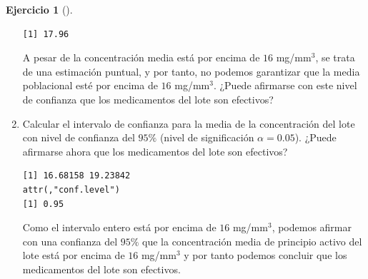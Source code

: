 \documentclass[
  a4paper,
]{scrreport}
\newenvironment{Shaded}{\begin{snugshade}}{\end{snugshade}}
\newcommand{\FunctionTok}[1]{\textcolor[rgb]{0.28,0.35,0.67}{#1}}
\newcommand{\NormalTok}[1]{\textcolor[rgb]{0.00,0.23,0.31}{#1}}
\newcommand{\OtherTok}[1]{\textcolor[rgb]{0.00,0.23,0.31}{#1}}
\newcommand{\SpecialCharTok}[1]{\textcolor[rgb]{0.37,0.37,0.37}{#1}}
\theoremstyle{definition}
\newtheorem{exercise}{Ejercicio}[chapter]
\theoremstyle{remark}
\begin{document}
\begin{exercise}[]
\begin{enumerate}
\begin{tcolorbox}
\begin{Shaded}
\end{Shaded}

\begin{verbatim}
[1] 17.96
\end{verbatim}

  A pesar de la concentración media está por encima de \(16\)
  mg/mm\(^3\), se trata de una estimación puntual, y por tanto, no
  podemos garantizar que la media poblacional esté por encima de \(16\)
  mg/mm\(^3\). ¿Puede afirmarse con este nivel de confianza que los
  medicamentos del lote son efectivos?

  \end{tcolorbox}
\item
  Calcular el intervalo de confianza para la media de la concentración
  del lote con nivel de confianza del \(95\%\) (nivel de significación
  \(\alpha =0.05\)). ¿Puede afirmarse ahora que los medicamentos del
  lote son efectivos?

  \begin{tcolorbox}[enhanced jigsaw, toprule=.15mm, rightrule=.15mm, arc=.35mm, colback=white, colbacktitle=quarto-callout-tip-color!10!white, toptitle=1mm, left=2mm, colframe=quarto-callout-tip-color-frame, opacityback=0, breakable, opacitybacktitle=0.6, bottomtitle=1mm, titlerule=0mm, title=\textcolor{quarto-callout-tip-color}{\faLightbulb}\hspace{0.5em}{Solución}, bottomrule=.15mm, coltitle=black, leftrule=.75mm]

\begin{Shaded}
\end{Shaded}

\begin{verbatim}
[1] 16.68158 19.23842
attr(,"conf.level")
[1] 0.95
\end{verbatim}

  Como el intervalo entero está por encima de \(16\) mg/mm\(^3\),
  podemos afirmar con una confianza del \(95\%\) que la concentración
  media de principio activo del lote está por encima de \(16\)
  mg/mm\(^3\) y por tanto podemos concluir que los medicamentos del lote
  son efectivos.


\end{tcolorbox}
\end{enumerate}
\end{exercise}
\end{document}
